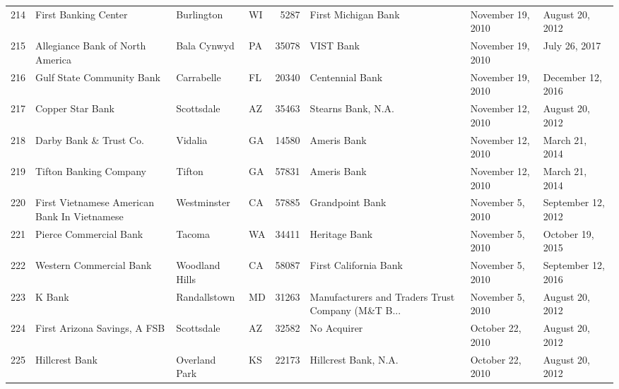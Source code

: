 \begin{tabular}{llllrlll}
214 &                               First Banking Center &          Burlington &  WI &   5287 &                                First Michigan Bank &   November 19, 2010 &     August 20, 2012 \\
215 &                   Allegiance Bank of North America &         Bala Cynwyd &  PA &  35078 &                                          VIST Bank &   November 19, 2010 &       July 26, 2017 \\
216 &                          Gulf State Community Bank &          Carrabelle &  FL &  20340 &                                    Centennial Bank &   November 19, 2010 &   December 12, 2016 \\
217 &                                   Copper Star Bank &          Scottsdale &  AZ &  35463 &                                 Stearns Bank, N.A. &   November 12, 2010 &     August 20, 2012 \\
218 &                             Darby Bank \& Trust Co. &             Vidalia &  GA &  14580 &                                        Ameris Bank &   November 12, 2010 &      March 21, 2014 \\
219 &                             Tifton Banking Company &              Tifton &  GA &  57831 &                                        Ameris Bank &   November 12, 2010 &      March 21, 2014 \\
220 &      First Vietnamese American Bank  In Vietnamese &         Westminster &  CA &  57885 &                                    Grandpoint Bank &    November 5, 2010 &  September 12, 2012 \\
221 &                             Pierce Commercial Bank &              Tacoma &  WA &  34411 &                                      Heritage Bank &    November 5, 2010 &    October 19, 2015 \\
222 &                            Western Commercial Bank &      Woodland Hills &  CA &  58087 &                              First California Bank &    November 5, 2010 &  September 12, 2016 \\
223 &                                             K Bank &        Randallstown &  MD &  31263 &  Manufacturers and Traders Trust Company (M\&T B... &    November 5, 2010 &     August 20, 2012 \\
224 &                       First Arizona Savings, A FSB &          Scottsdale &  AZ &  32582 &                                        No Acquirer &    October 22, 2010 &     August 20, 2012 \\
225 &                                     Hillcrest Bank &       Overland Park &  KS &  22173 &                               Hillcrest Bank, N.A. &    October 22, 2010 &     August 20, 2012 \\

\end{tabular}
